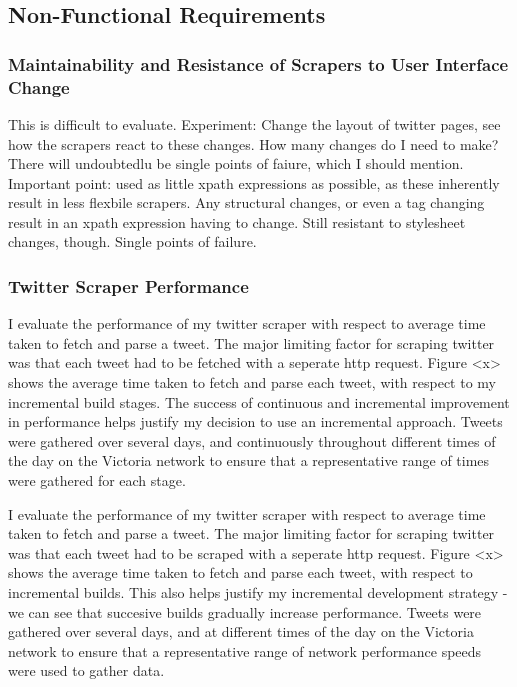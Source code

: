 \subsection{Non-Functional Requirements}

\subsubsection{Maintainability and Resistance of Scrapers to User Interface Change}
This is difficult to evaluate. Experiment: Change the layout of twitter pages, see how the scrapers react to these changes. How many changes do I need to make? There will undoubtedlu be single points of faiure, which I should mention. Important point: used as little xpath expressions as possible, as these inherently result in less flexbile scrapers. Any structural changes, or even a tag changing result in an xpath expression having to change. Still resistant to stylesheet changes, though.
Single points of failure.

\subsubsection{Twitter Scraper Performance}
I evaluate the performance of my twitter scraper with respect to average time taken to fetch and parse a tweet. The major limiting factor for scraping twitter was that each tweet had to be fetched with a seperate http request. Figure <x> shows the average time taken to fetch and parse each tweet, with respect to my incremental build stages. The success of continuous and incremental improvement in performance helps justify my decision to use an incremental approach. Tweets were gathered over several days, and continuously throughout different times of the day on the Victoria network to ensure that a representative range of times were gathered for each stage. 


I evaluate the performance of my twitter scraper with respect to average time taken to fetch and parse a tweet. The major limiting factor for scraping twitter was that each tweet had to be scraped with a seperate http request. Figure <x> shows the average time taken to fetch and parse each tweet, with respect to incremental builds. This also helps justify my incremental development strategy - we can see that succesive builds gradually increase performance. Tweets were gathered over several days, and at different times of the day on the Victoria network to ensure that a representative range of network performance speeds were used to gather data.\\


